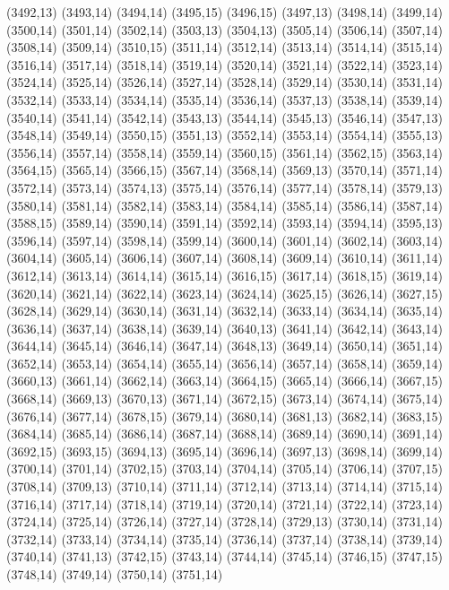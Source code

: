 (3492,13)
(3493,14)
(3494,14)
(3495,15)
(3496,15)
(3497,13)
(3498,14)
(3499,14)
(3500,14)
(3501,14)
(3502,14)
(3503,13)
(3504,13)
(3505,14)
(3506,14)
(3507,14)
(3508,14)
(3509,14)
(3510,15)
(3511,14)
(3512,14)
(3513,14)
(3514,14)
(3515,14)
(3516,14)
(3517,14)
(3518,14)
(3519,14)
(3520,14)
(3521,14)
(3522,14)
(3523,14)
(3524,14)
(3525,14)
(3526,14)
(3527,14)
(3528,14)
(3529,14)
(3530,14)
(3531,14)
(3532,14)
(3533,14)
(3534,14)
(3535,14)
(3536,14)
(3537,13)
(3538,14)
(3539,14)
(3540,14)
(3541,14)
(3542,14)
(3543,13)
(3544,14)
(3545,13)
(3546,14)
(3547,13)
(3548,14)
(3549,14)
(3550,15)
(3551,13)
(3552,14)
(3553,14)
(3554,14)
(3555,13)
(3556,14)
(3557,14)
(3558,14)
(3559,14)
(3560,15)
(3561,14)
(3562,15)
(3563,14)
(3564,15)
(3565,14)
(3566,15)
(3567,14)
(3568,14)
(3569,13)
(3570,14)
(3571,14)
(3572,14)
(3573,14)
(3574,13)
(3575,14)
(3576,14)
(3577,14)
(3578,14)
(3579,13)
(3580,14)
(3581,14)
(3582,14)
(3583,14)
(3584,14)
(3585,14)
(3586,14)
(3587,14)
(3588,15)
(3589,14)
(3590,14)
(3591,14)
(3592,14)
(3593,14)
(3594,14)
(3595,13)
(3596,14)
(3597,14)
(3598,14)
(3599,14)
(3600,14)
(3601,14)
(3602,14)
(3603,14)
(3604,14)
(3605,14)
(3606,14)
(3607,14)
(3608,14)
(3609,14)
(3610,14)
(3611,14)
(3612,14)
(3613,14)
(3614,14)
(3615,14)
(3616,15)
(3617,14)
(3618,15)
(3619,14)
(3620,14)
(3621,14)
(3622,14)
(3623,14)
(3624,14)
(3625,15)
(3626,14)
(3627,15)
(3628,14)
(3629,14)
(3630,14)
(3631,14)
(3632,14)
(3633,14)
(3634,14)
(3635,14)
(3636,14)
(3637,14)
(3638,14)
(3639,14)
(3640,13)
(3641,14)
(3642,14)
(3643,14)
(3644,14)
(3645,14)
(3646,14)
(3647,14)
(3648,13)
(3649,14)
(3650,14)
(3651,14)
(3652,14)
(3653,14)
(3654,14)
(3655,14)
(3656,14)
(3657,14)
(3658,14)
(3659,14)
(3660,13)
(3661,14)
(3662,14)
(3663,14)
(3664,15)
(3665,14)
(3666,14)
(3667,15)
(3668,14)
(3669,13)
(3670,13)
(3671,14)
(3672,15)
(3673,14)
(3674,14)
(3675,14)
(3676,14)
(3677,14)
(3678,15)
(3679,14)
(3680,14)
(3681,13)
(3682,14)
(3683,15)
(3684,14)
(3685,14)
(3686,14)
(3687,14)
(3688,14)
(3689,14)
(3690,14)
(3691,14)
(3692,15)
(3693,15)
(3694,13)
(3695,14)
(3696,14)
(3697,13)
(3698,14)
(3699,14)
(3700,14)
(3701,14)
(3702,15)
(3703,14)
(3704,14)
(3705,14)
(3706,14)
(3707,15)
(3708,14)
(3709,13)
(3710,14)
(3711,14)
(3712,14)
(3713,14)
(3714,14)
(3715,14)
(3716,14)
(3717,14)
(3718,14)
(3719,14)
(3720,14)
(3721,14)
(3722,14)
(3723,14)
(3724,14)
(3725,14)
(3726,14)
(3727,14)
(3728,14)
(3729,13)
(3730,14)
(3731,14)
(3732,14)
(3733,14)
(3734,14)
(3735,14)
(3736,14)
(3737,14)
(3738,14)
(3739,14)
(3740,14)
(3741,13)
(3742,15)
(3743,14)
(3744,14)
(3745,14)
(3746,15)
(3747,15)
(3748,14)
(3749,14)
(3750,14)
(3751,14)
